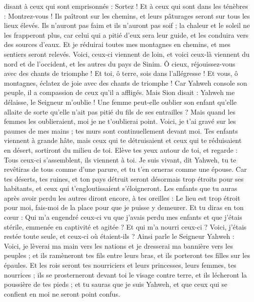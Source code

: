\begin{multicols}{2}
disant à ceux qui sont emprisonnés : Sortez ! Et à ceux qui sont dans les ténèbres : Montrez-vous ! Ils paîtront sur les chemins, et leurs pâturages seront sur tous les lieux élevés.
Ils n'auront pas faim et ils n'auront pas soif ; la chaleur et le soleil ne les frapperont plus, car celui qui a pitié d'eux sera leur guide, et les conduira vers des sources d'eaux.
Et je réduirai toutes mes montagnes en chemins, et mes sentiers seront relevés.
Voici, ceux-ci viennent de loin, et voici ceux-là viennent du nord et de l'occident, et les autres du pays de Sinim.
Ô cieux, réjouissez-vous avec des chants de triomphe ! Et toi, ô terre, sois dans l'allégresse ! Et vous, ô montagnes, éclatez de joie avec des chants de triomphe ! Car Yahweh console son peuple, il a compassion de ceux qu'il a affligés.
Mais Sion disait : Yahweh me délaisse, le Seigneur m'oublie !
Une femme peut-elle oublier son enfant qu'elle allaite de sorte qu'elle n'ait pas pitié du fils de ses entrailles ? Mais quand les femmes les oublieraient, moi je ne t'oublierai point.
Voici, je t'ai gravé sur les paumes de mes mains ; tes murs sont continuellement devant moi.
Tes enfants viennent à grande hâte, mais ceux qui te détruisaient et ceux qui te réduisaient en désert, sortiront du milieu de toi.
Elève tes yeux autour de toi, et regarde : Tous ceux-ci s'assemblent, ils viennent à toi. Je suis vivant, dit Yahweh, tu te revêtiras de tous comme d'une parure, et tu t'en orneras comme une épouse.
Car tes déserts, tes ruines, et ton pays détruit seront désormais trop étroits pour ses habitants, et ceux qui t'engloutissaient s'éloigneront.
Les enfants que tu auras après avoir perdu les autres diront encore, à tes oreilles : Le lieu est trop étroit pour moi, fais-moi de la place pour que je puisse y demeurer.
Et tu diras en ton cœur : Qui m'a engendré ceux-ci vu que j'avais perdu mes enfants et que j'étais stérile, emmenée en captivité et agitée ? Et qui m'a nourri ceux-ci ? Voici, j'étais restée toute seule, et ceux-ci où étaient-ils ?
Ainsi parle le Seigneur Yahweh : Voici, je lèverai ma main vers les nations et je dresserai ma bannière vers les peuples ; et ils ramèneront tes fils entre leurs bras, et ils porteront tes filles sur les épaules.
Et les rois seront tes nourriciers et leurs princesses, leurs femmes, tes nourrices ; ils se prosterneront devant toi le visage contre terre, et ils lécheront la poussière de tes pieds ; et tu sauras que je suis Yahweh, et que ceux qui se confient en moi ne seront point confus.

\end{multicols}
